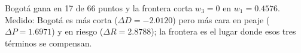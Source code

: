 {Bogotá gana en 17 de 66 puntos y la frontera corta $w_3=0$ en $w_1 = 0.4576$.}
{Medido: Bogotá es más corta ($\Delta D = -2.0120$) pero más cara en peaje ($\Delta P = 1.6971$) y en riesgo ($\Delta R = 2.8788$); la frontera es el lugar donde esos tres términos se compensan.}
